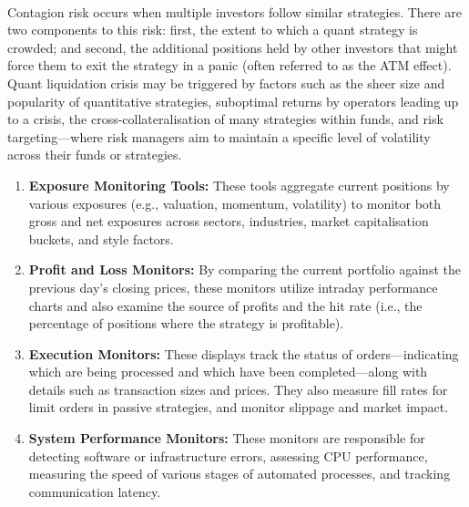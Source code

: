 \begin{definition} \\
Contagion risk occurs when multiple investors follow similar strategies. There are two components to this risk: first, the extent to which a quant strategy is crowded; and second, the additional positions held by other investors that might force them to exit the strategy in a panic (often referred to as the ATM effect).\\
Quant liquidation crisis may be triggered by factors such as the sheer size and popularity of quantitative strategies, suboptimal returns by operators leading up to a crisis, the cross-collateralisation of many strategies within funds, and risk targeting—where risk managers aim to maintain a specific level of volatility across their funds or strategies.
\end{definition}

\begin{method} 
\begin{enumerate}[label=\roman*.]
\setlength{\itemsep}{0pt}
  \item \textbf{Exposure Monitoring Tools:} These tools aggregate current positions by various exposures (e.g., valuation, momentum, volatility) to monitor both gross and net exposures across sectors, industries, market capitalisation buckets, and style factors.
  \item \textbf{Profit and Loss Monitors:} By comparing the current portfolio against the previous day’s closing prices, these monitors utilize intraday performance charts and also examine the source of profits and the hit rate (i.e., the percentage of positions where the strategy is profitable).
  \item \textbf{Execution Monitors:} These displays track the status of orders—indicating which are being processed and which have been completed—along with details such as transaction sizes and prices. They also measure fill rates for limit orders in passive strategies, and monitor slippage and market impact.
  \item \textbf{System Performance Monitors:} These monitors are responsible for detecting software or infrastructure errors, assessing CPU performance, measuring the speed of various stages of automated processes, and tracking communication latency.
\end{enumerate}
\end{method}